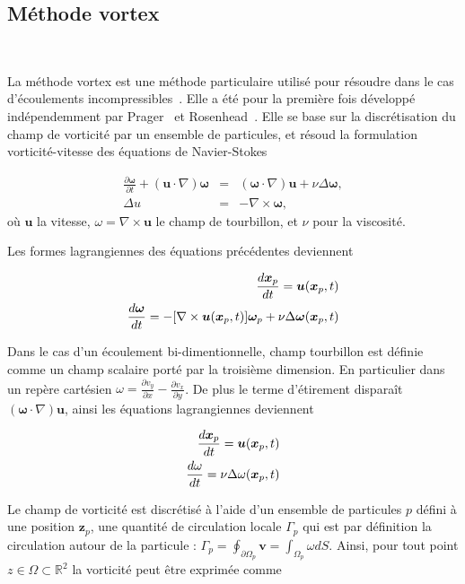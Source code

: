 \subsection{Méthode vortex}~\label{sec:vortex}

La méthode vortex est une méthode particulaire utilisé pour résoudre  dans le cas d'écoulements incompressibles~\cite{Cottet_Koumoutsakos_2000}. Elle a été pour la première fois développé indépendemment par Prager~\cite{prager1928druckverteilung} et Rosenhead~\cite{rosenhead1931formation}. Elle se base sur la discrétisation du champ de vorticité par un ensemble de particules, et résoud la formulation vorticité-vitesse des équations de Navier-Stokes

\begin{eqnarray*}
    \frac{\partial \bm \omega}{\partial t} + (\bm{u} \cdot \nabla) \bm \omega & = &(\bm \omega \cdot \nabla) \bm u + \nu \Delta \bm \omega, \\
    \Delta u  & =&  -\nabla \times \bm \omega,
\end{eqnarray*}où $\bm{u}$ la vitesse, $\omega= \nabla \times \bm u$ le champ de tourbillon, et $\nu$ pour la viscosité.

Les formes lagrangiennes des équations précédentes deviennent

\begin{eqnarray*}
    \frac{d \bm{x}_p}{dt} = \bm u(\bm{x}_p, t) \\
    \frac{d\bm \omega}{dt} = - [\nabla \times \bm u (\bm{x}_p, t)]\bm \omega_p + \nu \Delta \bm \omega(\bm{x}_p, t)
\end{eqnarray*}

Dans le cas d'un écoulement bi-dimentionnelle, champ tourbillon est définie comme un champ scalaire porté par la troisième dimension. En particulier dans un repère cartésien $\omega = \frac{\partial v_y}{\partial x} - \frac{\partial v_x}{\partial y}$. De plus le terme d'étirement disparaît $(\bm \omega \cdot \nabla) \bm u$, ainsi les équations lagrangiennes deviennent

\begin{eqnarray*}
    \frac{d \bm{x}_p}{dt} = \bm u(\bm{x}_p, t) \\
    \frac{d\omega}{dt} = \nu \Delta \omega(\bm{x}_p, t)
\end{eqnarray*}

Le champ de vorticité est discrétisé à l'aide d'un ensemble de particules $p$ défini à une position $\bm z_p$, une quantité de circulation locale $\Gamma_p$ qui est par définition la circulation autour de la particule : $\Gamma_p = \oint_{\partial \Omega_p} \bm v = \int_{\Omega_p} \omega dS$. Ainsi, pour tout point $z \in \Omega \subset \mathbb R^2$ la vorticité peut être exprimée comme

